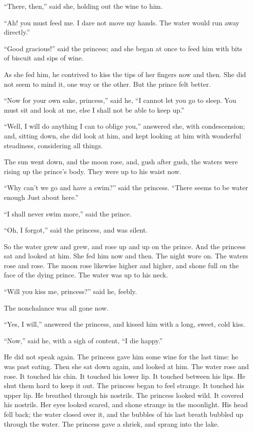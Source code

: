 \documentclass[12pt]{memoir}
\begin{document}
``There, then,'' said she, holding out the wine to him.

``Ah! you must feed me.  I dare not move my hands.  The water would
run away directly.''

``Good gracious!'' said the princess; and she began at once to feed
him with bits of biscuit and sips of wine.

As she fed him, he contrived to kiss the tips of her fingers now and
then.  She did not seem to mind it, one way or the other.  But the
prince felt better.

``Now for your own sake, princess,'' said he, ``I cannot let you go to
sleep.  You must sit and look at me, else I shall not be able to keep
up.''

``Well, I will do anything I can to oblige you,'' answered she, with
condescension; and, sitting down, she did look at him, and kept
looking at him with wonderful steadiness, considering all things.

The sun went down, and the moon rose, and, gush after gush, the waters
were rising up the prince's body.  They were up to his waist now.

``Why can't we go and have a swim?'' said the princess.  ``There seems
to be water enough Just about here.''

``I shall never swim more,'' said the prince.

``Oh, I forgot,'' said the princess, and was silent.

So the water grew and grew, and rose up and up on the prince.  And the
princess sat and looked at him.  She fed him now and then.  The night
wore on.  The waters rose and rose.  The moon rose likewise higher and
higher, and shone full on the face of the dying prince.  The water was
up to his neck.

``Will you kiss me, princess?'' said he, feebly.

The nonchalance was all gone now.

``Yes, I will,'' answered the princess, and kissed him with a long,
sweet, cold kiss.

``Now,'' said he, with a sigh of content, ``I die happy.''

He did not speak again.  The princess gave him some wine for the last
time: he was past eating.  Then she sat down again, and looked at him.
The water rose and rose.  It touched his chin.  It touched his lower
lip.  It touched between his lips.  He shut them hard to keep it out.
The princess began to feel strange.  It touched his upper lip.  He
breathed through his nostrils.  The princess looked wild.  It covered
his nostrils.  Her eyes looked scared, and shone strange in the
moonlight.  His head fell back; the water closed over it, and the
bubbles of his last breath bubbled up through the water.  The princess
gave a shriek, and sprang into the lake.
\end{document}
